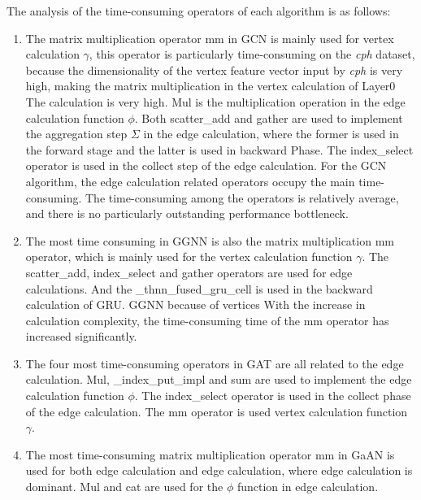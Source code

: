 The analysis of the time-consuming operators of each algorithm is as follows:

\begin{enumerate}
    \item The matrix multiplication operator mm in GCN is mainly used for vertex calculation $\gamma$, 
    this operator is particularly time-consuming on the \textit{cph} dataset, 
    because the dimensionality of the vertex feature vector input by \textit{cph} is very high,
    making the matrix multiplication in the vertex calculation of Layer0 The calculation is very high.
    Mul is the multiplication operation in the edge calculation function $\phi$.
    Both scatter\_add and gather are used to implement the aggregation step $\Sigma$ in the edge calculation,
    where the former is used in the forward stage and the latter is used in backward Phase.
    The index\_select operator is used in the collect step of the edge calculation.
    For the GCN algorithm, the edge calculation related operators occupy the main time-consuming.
    The time-consuming among the operators is relatively average, and there is no particularly outstanding performance bottleneck.
    \item The most time consuming in GGNN is also the matrix multiplication mm operator,
    which is mainly used for the vertex calculation function $\gamma$. The scatter\_add, index\_select and gather operators
    are used for edge calculations. And the \_thnn\_fused\_gru\_cell is used in the backward calculation of GRU.
    GGNN because of vertices With the increase in calculation complexity, the time-consuming time of the mm operator has increased significantly.
    \item The four most time-consuming operators in GAT are all related to the edge calculation. 
    Mul, \_index\_put\_impl and sum are used to implement the edge calculation function $\phi$.
    The index\_select operator is used in the collect phase of the edge calculation. 
    The mm operator is used vertex calculation function $\gamma$.
    \item The most time-consuming matrix multiplication operator mm in GaAN is used for both edge calculation and edge calculation,
    where edge calculation is dominant. Mul and cat are used for the $\phi$ function in edge calculation.
\end{enumerate}

